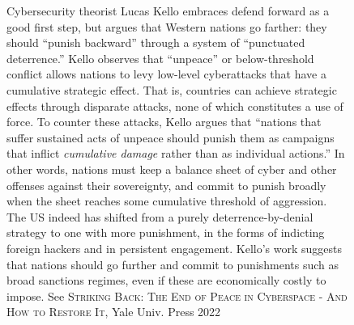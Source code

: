 \documentclass{article}
\begin{document}
\begin{figure}
\caption{Cybersecurity theorist Lucas Kello embraces defend forward as a good first step, but argues that Western nations go farther: they should ``punish backward'' through a system of ``punctuated deterrence.'' Kello observes that ``unpeace'' or below-threshold conflict allows nations to levy low-level cyberattacks that have a cumulative strategic effect. That is, countries can achieve strategic effects through disparate attacks, none of which constitutes a use of force. To counter these attacks, Kello argues that ``nations that  suffer  sustained  acts  of  unpeace  should  punish  them  as  campaigns  that inflict \textit{cumulative damage} rather than as individual actions.''  In other words, nations must keep a balance sheet of cyber and other offenses against their sovereignty, and commit to punish broadly when the sheet reaches some cumulative threshold of aggression. The US indeed has shifted from a purely deterrence-by-denial strategy to one with more punishment, in the forms of indicting foreign hackers and in persistent engagement. Kello's work suggests that nations should go further and commit to punishments such as broad sanctions regimes, even if these are economically costly to impose. See \textsc{Striking Back: The End of Peace in Cyberspace - And How to Restore It}, Yale Univ. Press 2022}
\end{figure}
\end{document}
